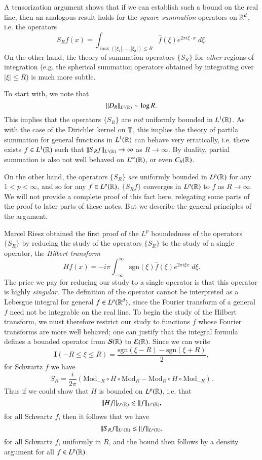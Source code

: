 A tensorization argument shows that if we can establish such a bound on the real line, then an analogous result holds for the \emph{square summation} operators on $\operatorname{\mathbb{R}}^d$, i.e. the operators
%
\[ S_R f(x) = \int_{\max(|\xi_1|, \dots, |\xi_d|) \leq R} \widehat{f}(\xi) e^{2 \pi i \xi \cdot x}\; d\xi. \]
%
On the other hand, the theory of summation operators $\{ S_R \}$ for \emph{other} regions of integration (e.g. the spherical summation operators obtained by integrating over $|\xi| \leq R$) is much more subtle.

To start with, we note that
%
\[ \| D_R \|_{L^1(\operatorname{\mathbb{R}})} \sim \log R. \]
%
This implies that the operators $\{ S_R \}$ are \emph{not} uniformly bounded in $L^1(\operatorname{\mathbb{R}})$. As with the case of the Dirichlet kernel on $\operatorname{\mathbb{T}}$, this implies the theory of partila summation for general functions in $L^1(\operatorname{\mathbb{R}})$ can behave very erratically, i.e. there exists $f \in L^1(\operatorname{\mathbb{R}})$ such that $\| S_R f \|_{L^1(\operatorname{\mathbb{R}})} \to \infty$ as $R \to \infty$. By duality, partial summation is also not well behaved on $L^\infty(\operatorname{\mathbb{R}})$, or even $C_b(\operatorname{\mathbb{R}})$.

On the other hand, the operators $\{ S_R \}$ \emph{are} uniformly bounded in $L^p(\operatorname{\mathbb{R}})$ for any $1 < p < \infty$, and so for any $f \in L^p(\operatorname{\mathbb{R}})$, $\{ S_R f \}$ converges in $L^p(\operatorname{\mathbb{R}})$ to $f$ as $R \to \infty$. We will not provide a complete proof of this fact here, relegating some parts of the proof to later parts of these notes. But we describe the general principles of the argument.

Marcel Riesz obtained the first proof of the $L^p$ boundedness of the operators $\{ S_R \}$ by reducing the study of the operators $\{ S_R \}$ to the study of a single operator, the \emph{Hilbert transform}
%
\[ Hf(x) = - i \pi \int_{-\infty}^\infty \text{sgn}(\xi) \widehat{f}(\xi) e^{2 \pi i \xi x}\; d\xi. \]
%
The price we pay for reducing our study to a single operator is that this operator is highly \emph{singular}. The definition of the operator cannot be interpreted as a Lebesgue integral for general $f \in L^p(\operatorname{\mathbb{R}}^d)$, since the Fourier transform of a general $f$ need not be integrable on the real line. To begin the study of the Hilbert transform, we must therefore restrict our study to functions $f$ whose Fourier transforms are more well behaved; one can justify that the integral formula defines a bounded operator from $\operatorname{\mathcal{S}}(\operatorname{\mathbb{R}})$ to $\operatorname{\mathcal{E}}(\operatorname{\mathbb{R}})$. Since we can write
%
\[ \mathbf{I}(-R \leq \xi \leq R) = \frac{\text{sgn}(\xi - R) - \text{sgn}(\xi + R)}{2}, \]
%
for Schwartz $f$ we have
%
\[ S_R = \frac{i}{2 \pi} \left( \text{Mod}_{-R} \circ H \circ \text{Mod}_R - \text{Mod}_R \circ H \circ \text{Mod}_{-R} \right). \]
%
Thus if we could show that $H$ is bounded on $L^p(\operatorname{\mathbb{R}})$, i.e. that
%
\[ \| Hf \|_{L^p(\operatorname{\mathbb{R}})} \lesssim \| f \|_{L^p(\operatorname{\mathbb{R}})}, \]
%
for all Schwartz $f$, then it follows that we have
%
\[ \| S_R f \|_{L^p(\operatorname{\mathbb{R}})} \lesssim \| f \|_{L^p(\operatorname{\mathbb{R}})}, \]
%
for all Schwartz $f$, uniformly in $R$, and the bound then follows by a density argument for all $f \in L^p(\operatorname{\mathbb{R}})$.

